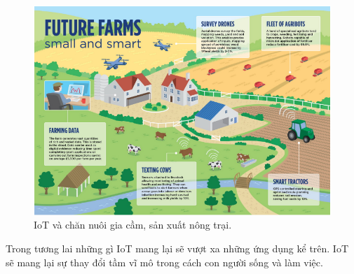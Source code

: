 \begin{enumerate}
\begin{center}
    \begin{figure}[htp]
    \begin{center}
     \includegraphics[scale=0.6]{image1/nongtrai.png}
    \end{center}
    \caption{IoT và chăn nuôi gia cầm, sản xuất nông trại.}
    \label{refhinh1}
    \end{figure}
\end{center} 
\end{enumerate}

Trong tương lai những gì IoT mang lại sẽ vượt xa những ứng dụng kể trên. IoT sẽ mang lại sự thay đổi tầm vĩ mô trong cách con người sống và làm việc\cite{tl13}.
